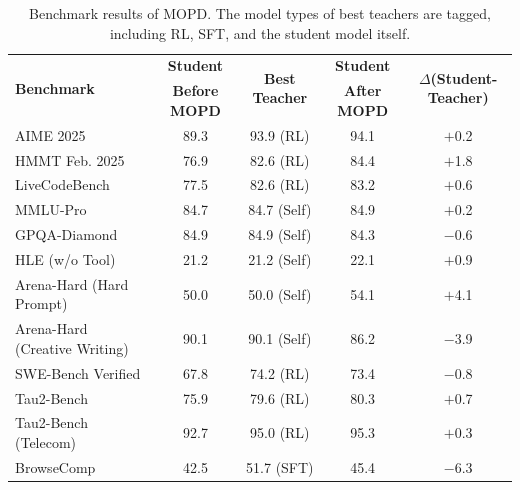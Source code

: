 \begin{table}[htbp]
    \centering
    \small
    \begin{tabular}{l c c c c}
    \toprule
    \multirow{2}{*}{\textbf{Benchmark}}  & \textbf{Student} & \multirow{2}{*}{\textbf{Best Teacher}} & \textbf{Student} & \multirow{2}{*}{\textbf{$\Delta$(Student-Teacher)}} \\
                      & \textbf{Before MOPD} &  & \textbf{After MOPD} &  \\
    \midrule
AIME 2025                          &  89.3  &  93.9 \tiny{(RL)}  &  94.1 & $+$0.2 \\
HMMT Feb. 2025                          &  76.9  &  82.6 \tiny{(RL)}  &  84.4 & $+$1.8 \\
LiveCodeBench                &  77.5  &  82.6 \tiny{(RL)}  &  83.2 & $+$0.6 \\
MMLU-Pro                        &  84.7  &  84.7 \tiny{(Self)}  &  84.9 & $+$0.2 \\
GPQA-Diamond                    &  84.9  &  84.9 \tiny{(Self)}  &  84.3 & $-$0.6 \\
HLE \tiny{(w/o Tool)}                  &  21.2  &  21.2 \tiny{(Self)}  &  22.1 & $+$0.9 \\
Arena-Hard \tiny{(Hard Prompt)}        &  50.0  &  50.0 \tiny{(Self)}  &  54.1 & $+$4.1 \\
Arena-Hard \tiny{(Creative Writing)}   &  90.1  &  90.1 \tiny{(Self)}  &  86.2 & $-$3.9 \\
SWE-Bench Verified              &  67.8  &  74.2 \tiny{(RL)}  &  73.4 & $-$0.8 \\
Tau2-Bench                      &  75.9  &  79.6 \tiny{(RL)}  &  80.3 & $+$0.7 \\
Tau2-Bench \tiny{(Telecom)}              &  92.7  &  95.0 \tiny{(RL)}  &  95.3 & $+$0.3 \\
BrowseComp                      &  42.5  &  51.7 \tiny{(SFT)}  &  45.4 & $-$6.3 \\
    \bottomrule
    \end{tabular}
    \caption{Benchmark results of MOPD. The model types of best teachers are tagged, including RL, SFT, and the student model itself.}
    \label{tab:mopd_eval}
\end{table}



